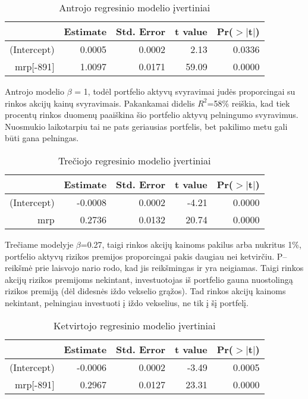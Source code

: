 \documentclass[12pt, a14paper, lithuanian]{article}
\begin{document}
\begin{table}[ht]
\begin{center}
\begin{tabular}{rrrrr}
\hline
& Estimate & Std. Error & t value & Pr($>$$|$t$|$) \\
\hline
(Intercept) & 0.0005 & 0.0002 & 2.13 & 0.0336 \\
mrp[-891] & 1.0097 & 0.0171 & 59.09 & 0.0000 \\
\hline
\end{tabular}
\end{center}
\caption{Antrojo regresinio modelio įvertiniai}
\end{table}

Antrojo modelio $\beta$ = 1, todėl portfelio aktyvų svyravimai judės proporcingai su rinkos akcijų kainų svyravimais.
Pakankamai didelis $R^2$=58\% reiškia, kad tiek procentų rinkos duomenų paaiškina šio portfelio aktyvų pelningumo
svyravimus. Nuosmukio laikotarpiu tai ne pats geriausias portfelis, bet pakilimo metu gali būti gana pelningas.



\begin{table}[ht]
\begin{center}
\begin{tabular}{rrrrr}
\hline
& Estimate & Std. Error & t value & Pr($>$$|$t$|$) \\
\hline
(Intercept) & -0.0008 & 0.0002 & -4.21 & 0.0000 \\
mrp & 0.2736 & 0.0132 & 20.74 & 0.0000 \\
\hline
\end{tabular}
\end{center}
\caption{Trečiojo regresinio modelio įvertiniai}
\end{table}

Trečiame modelyje $\beta$=0.27, taigi rinkos akcijų kainoms pakilus arba nukritus 1\%, portfelio aktyvų rizikos premijos
proporcingai pakis daugiau nei ketvirčiu. P--reikšmė prie laisvojo nario rodo, kad jis reikšmingas ir yra 
neigiamas. Taigi rinkos akcijų rizikos premijoms nekintant, investuotojas iš portfelio gauna
nuostolingą rizikos premiją (dėl didesnės iždo vekselio grąžos). Tad rinkos akcijų kainoms nekintant,
pelningiau investuoti į iždo vekselius, ne tik į šį portfelį.



\begin{table}[ht]
\begin{center}
\begin{tabular}{rrrrr}
\hline
& Estimate & Std. Error & t value & Pr($>$$|$t$|$) \\
\hline
(Intercept) & -0.0006 & 0.0002 & -3.49 & 0.0005 \\
mrp[-891] & 0.2967 & 0.0127 & 23.31 & 0.0000 \\
\hline
\end{tabular}
\end{center}
\caption{Ketvirtojo regresinio modelio įvertiniai}
\end{table}
\end{document}
